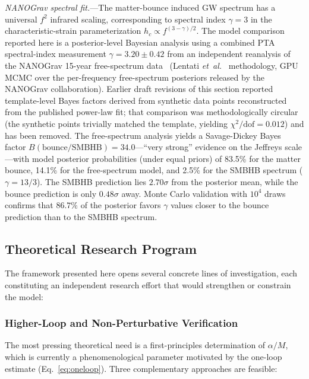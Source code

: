 \documentclass[aps,prd,twocolumn,superscriptaddress,showpacs,preprintnumbers,nofootinbib,longbibliography,floatfix]{revtex4-2}
\newcommand{\etal}{\textit{et~al.}}
\begin{document}
\textit{NANOGrav spectral fit.}---The matter-bounce induced GW spectrum has a universal $f^2$ infrared scaling, corresponding to spectral index $\gamma = 3$ in the characteristic-strain parameterization $h_c \propto f^{(3-\gamma)/2}$. The model comparison reported here is a posterior-level Bayesian analysis using a combined PTA spectral-index measurement $\gamma = 3.20 \pm 0.42$ from an independent reanalysis of the NANOGrav 15-year free-spectrum data~\cite{Agazie:2023ng15} (Lentati \etal~\cite{Lentati:2023} methodology, GPU MCMC over the per-frequency free-spectrum posteriors released by the NANOGrav collaboration). Earlier draft revisions of this section reported template-level Bayes factors derived from synthetic data points reconstructed from the published power-law fit; that comparison was methodologically circular (the synthetic points trivially matched the template, yielding $\chi^2/\text{dof} = 0.012$) and has been removed. The free-spectrum analysis yields a Savage-Dickey Bayes factor $B(\text{bounce}/\text{SMBHB}) = 34.0$---``very strong'' evidence on the Jeffreys scale---with model posterior probabilities (under equal priors) of 83.5\% for the matter bounce, 14.1\% for the free-spectrum model, and 2.5\% for the SMBHB spectrum ($\gamma = 13/3$). The SMBHB prediction lies $2.70\sigma$ from the posterior mean, while the bounce prediction is only $0.48\sigma$ away. Monte Carlo validation with $10^4$ draws confirms that $86.7\%$ of the posterior favors $\gamma$ values closer to the bounce prediction than to the SMBHB spectrum.

\subsection{Theoretical Research Program}\label{sec:theory_program}

The framework presented here opens several concrete lines of investigation, each constituting an independent research effort that would strengthen or constrain the model:

\subsubsection{Higher-Loop and Non-Perturbative Verification}

The most pressing theoretical need is a first-principles determination of $\alpha/M$, which is currently a phenomenological parameter motivated by the one-loop estimate (Eq.~\ref{eq:oneloop}). Three complementary approaches are feasible:
\end{document}
